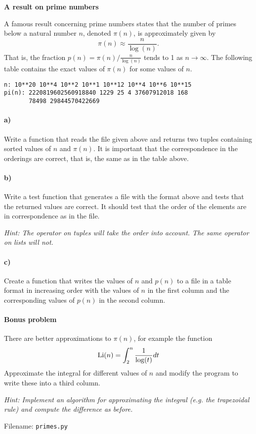 \begin{Problem}{\textbf{A result on prime numbers}} \label{prob46}

\noindent A famous result concerning prime numbers states that the number of primes below
a natural number $n$, denoted $\pi(n)$, is approximately given by
\begin{equation*}
    \pi(n)\approx \frac{n}{\log(n)}.
\end{equation*}
That is, the fraction $p(n)=\pi(n)/\frac{n}{\log(n)}$ tends to 1 as $n\to \infty$.
The following table contains the exact values of $\pi(n)$ for some values of $n$.
\begin{lstlisting}
n: 10**20 10**4 10**2 10**1 10**12 10**4 10**6 10**15
pi(n): 2220819602560918840 1229 25 4 37607912018 168
       78498 29844570422669
\end{lstlisting}
\paragraph{a)}
Write a function that reads the file given above and returns two tuples containing
sorted values of $n$ and $\pi(n)$. It is important that the correspondence
in the orderings are correct, that is, the same as in the table above.
\paragraph{b)}
Write a test function that generates a file with the format above and tests that
the returned values are correct. It should test that the order of the elements
are in correspondence as in the file.

\emph{Hint: The \pythoninline{==} operator on tuples will take the order into account.
The same operator on lists will not.}
\paragraph{c)}
Create a function that writes the values of $n$ and $p(n)$ to a file in a table format in
increasing order with the values of $n$ in the first column and the corresponding
values of $p(n)$ in the second column.
\paragraph{Bonus problem}
There are better approximations to $\pi(n)$, for example the function
\begin{equation*}
    \operatorname{Li}(n)=\int_2^n \frac{1}{\log(t)} dt
\end{equation*}
Approximate the integral for different values of $n$ and modify the program to
write these into a third column.

\emph{Hint: Implement an algorithm for approximating the integral (e.g. the trapezoidal
rule) and compute the difference as before.}

Filename: \texttt{primes.py}
\end{Problem}

